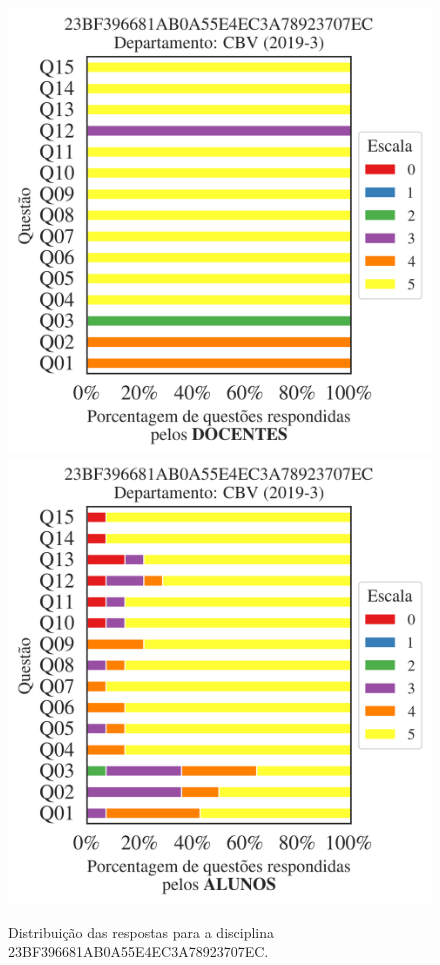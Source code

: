 \documentclass[a4paper,10pt]{article}
\begin{document}
\begin{figure}[h]
\centering
\includegraphics[width=0.485\linewidth]{analise_disciplina_departamento_CBV_23BF396681AB0A55E4EC3A78923707EC_docentes.png}
\includegraphics[width=0.485\linewidth]{analise_disciplina_departamento_CBV_23BF396681AB0A55E4EC3A78923707EC_alunos.png}
\caption{\label{fig:analise_geral_departamento}                Distribuição das respostas para a disciplina 23BF396681AB0A55E4EC3A78923707EC. }
\end{figure}
\end{document}
